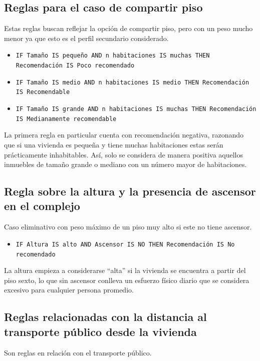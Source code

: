 \documentclass[12pt]{report} %
\begin{document}
    \subsection{Reglas para el caso de compartir piso}
    Estas reglas buscan reflejar la opción de compartir piso, pero con un peso mucho menor ya que esto 
    es el perfil secundario considerado. 

    \begin{itemize}
        \item \texttt{IF Tamaño IS pequeño AND n habitaciones IS muchas THEN Recomendación IS Poco recomendado}
        \item \texttt{IF Tamaño IS medio AND n habitaciones IS medio THEN Recomendación IS Recomendable}
        \item \texttt{IF Tamaño IS grande AND n habitaciones IS muchas THEN Recomendación IS Medianamente recomendable}
    \end{itemize}

    La primera regla en particular cuenta con recomendación negativa, razonando que si una vivienda es pequeña 
    y tiene muchas habitaciones estas serán prácticamente inhabitables. Así, solo se considera de manera 
    positiva aquellos inmuebles de tamaño grande o mediano con un número mayor de habitaciones.

    \subsection{Regla sobre la altura y la presencia de ascensor en el complejo}
    Caso eliminativo con peso máximo de un piso muy alto si este no tiene ascensor. 

    \begin{itemize}
        \item \texttt{IF Altura IS alto AND Ascensor IS NO THEN Recomendación IS No recomendado}
    \end{itemize}

    La altura empieza a considerarse ``alta'' si la vivienda se encuentra a partir del piso sexto, 
    lo que sin ascensor conlleva un esfuerzo físico diario que se considera excesivo para cualquier 
    persona promedio.

    \subsection{Reglas relacionadas con la distancia al transporte público desde la vivienda}
    Son reglas en relación con el transporte público.
\end{document}
